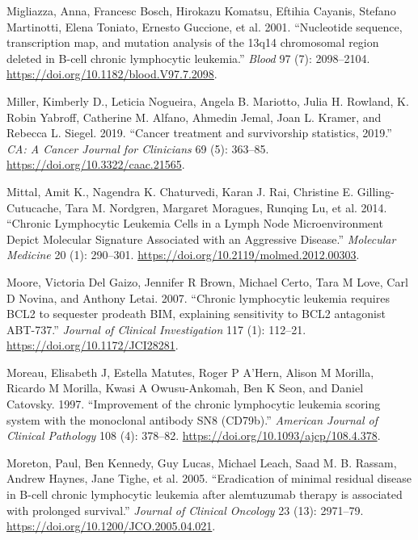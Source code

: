 \documentclass[11pt, a4paper, twosided]{book}
\newenvironment{CSLReferences}%
  {}%
  {\par}
\begin{document}
\begin{CSLReferences}{1}{0}
\leavevmode{}%
Migliazza, Anna, Francesc Bosch, Hirokazu Komatsu, Eftihia Cayanis, Stefano Martinotti, Elena Toniato, Ernesto Guccione, et al. 2001. {``{Nucleotide sequence, transcription map, and mutation analysis of the 13q14 chromosomal region deleted in B-cell chronic lymphocytic leukemia}.''} \emph{Blood} 97 (7): 2098--2104. \url{https://doi.org/10.1182/blood.V97.7.2098}.

\leavevmode{}%
Miller, Kimberly D., Leticia Nogueira, Angela B. Mariotto, Julia H. Rowland, K. Robin Yabroff, Catherine M. Alfano, Ahmedin Jemal, Joan L. Kramer, and Rebecca L. Siegel. 2019. {``{Cancer treatment and survivorship statistics, 2019}.''} \emph{CA: A Cancer Journal for Clinicians} 69 (5): 363--85. \url{https://doi.org/10.3322/caac.21565}.

\leavevmode{}%
Mittal, Amit K., Nagendra K. Chaturvedi, Karan J. Rai, Christine E. Gilling-Cutucache, Tara M. Nordgren, Margaret Moragues, Runqing Lu, et al. 2014. {``{Chronic Lymphocytic Leukemia Cells in a Lymph Node Microenvironment Depict Molecular Signature Associated with an Aggressive Disease}.''} \emph{Molecular Medicine} 20 (1): 290--301. \url{https://doi.org/10.2119/molmed.2012.00303}.

\leavevmode{}%
Moore, Victoria Del Gaizo, Jennifer R Brown, Michael Certo, Tara M Love, Carl D Novina, and Anthony Letai. 2007. {``{Chronic lymphocytic leukemia requires BCL2 to sequester prodeath BIM, explaining sensitivity to BCL2 antagonist ABT-737}.''} \emph{Journal of Clinical Investigation} 117 (1): 112--21. \url{https://doi.org/10.1172/JCI28281}.

\leavevmode{}%
Moreau, Elisabeth J, Estella Matutes, Roger P A'Hern, Alison M Morilla, Ricardo M Morilla, Kwasi A Owusu-Ankomah, Ben K Seon, and Daniel Catovsky. 1997. {``{Improvement of the chronic lymphocytic leukemia scoring system with the monoclonal antibody SN8 (CD79b)}.''} \emph{American Journal of Clinical Pathology} 108 (4): 378--82. \url{https://doi.org/10.1093/ajcp/108.4.378}.

\leavevmode{}%
Moreton, Paul, Ben Kennedy, Guy Lucas, Michael Leach, Saad M. B. Rassam, Andrew Haynes, Jane Tighe, et al. 2005. {``{Eradication of minimal residual disease in B-cell chronic lymphocytic leukemia after alemtuzumab therapy is associated with prolonged survival}.''} \emph{Journal of Clinical Oncology} 23 (13): 2971--79. \url{https://doi.org/10.1200/JCO.2005.04.021}.


\end{CSLReferences}
\end{document}
